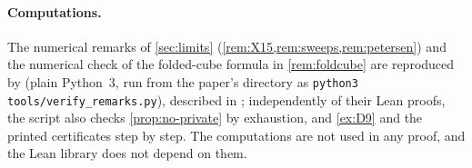 \paragraph{Computations.} The numerical remarks of \cref{sec:limits} (\cref{rem:X15,rem:sweeps,rem:petersen}) and the
numerical check of the folded-cube formula in \cref{rem:foldcube} are reproduced by 
(plain Python~3, run from the paper's directory as \texttt{python3 tools/verify\_remarks.py}), described in
; independently of their Lean proofs, the script also checks \cref{prop:no-private} by
exhaustion, and \cref{ex:D9} and the printed certificates step by step. The computations are not used in any proof, and
the Lean library does not depend on them.
